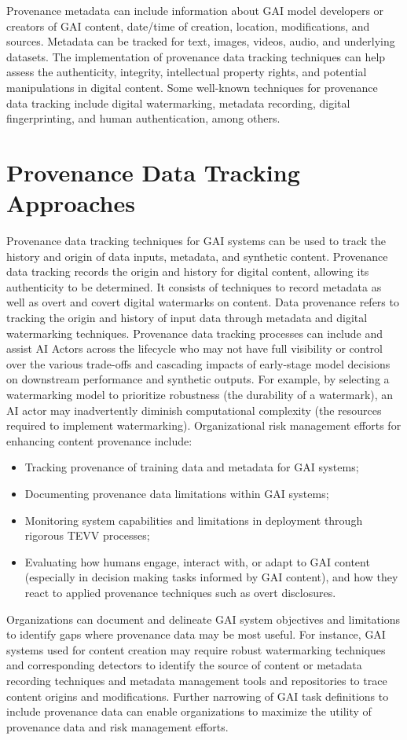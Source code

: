 \documentclass[10pt]{article}
\begin{document}
Provenance metadata can include information about GAI model developers or creators of GAI content, date/time of creation, location, modifications, and sources. Metadata can be tracked for text, images, videos, audio, and underlying datasets. The implementation of provenance data tracking techniques can help assess the authenticity, integrity, intellectual property rights, and potential manipulations in digital content. Some well-known techniques for provenance data tracking include digital watermarking, metadata recording, digital fingerprinting, and human authentication, among others.
\section*{Provenance Data Tracking Approaches}
Provenance data tracking techniques for GAI systems can be used to track the history and origin of data inputs, metadata, and synthetic content. Provenance data tracking records the origin and history for digital content, allowing its authenticity to be determined. It consists of techniques to record metadata as well as overt and covert digital watermarks on content. Data provenance refers to tracking the origin and history of input data through metadata and digital watermarking techniques. Provenance data tracking processes can include and assist AI Actors across the lifecycle who may not have full visibility or control over the various trade-offs and cascading impacts of early-stage model decisions on downstream performance and synthetic outputs. For example, by selecting a watermarking model to prioritize robustness (the durability of a watermark), an AI actor may inadvertently diminish computational complexity (the resources required to implement watermarking). Organizational risk management efforts for enhancing content provenance include:
\begin{itemize}
  \item Tracking provenance of training data and metadata for GAI systems;
  \item Documenting provenance data limitations within GAI systems;
  \item Monitoring system capabilities and limitations in deployment through rigorous TEVV processes;
  \item Evaluating how humans engage, interact with, or adapt to GAI content (especially in decision making tasks informed by GAI content), and how they react to applied provenance techniques such as overt disclosures.
\end{itemize}
Organizations can document and delineate GAI system objectives and limitations to identify gaps where provenance data may be most useful. For instance, GAI systems used for content creation may require robust watermarking techniques and corresponding detectors to identify the source of content or metadata recording techniques and metadata management tools and repositories to trace content origins and modifications. Further narrowing of GAI task definitions to include provenance data can enable organizations to maximize the utility of provenance data and risk management efforts.
\end{document}
